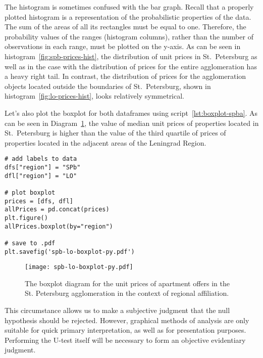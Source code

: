 \documentclass[]{scrreprt}
\begin{document}
The histogram is sometimes confused with the bar graph. Recall that a properly plotted histogram is a representation of the probabilistic properties of the data. The sum of the areas of all its rectangles must be equal to one. Therefore, the probability values of the ranges (histogram columns), rather than the number of observations in each range, must be plotted on the y-axis. As can be seen in histogram~\ref{fig:spb-prices-hist}, the distribution of unit prices in St.~Petersburg as well as in the case with the distribution of prices for the entire agglomeration has a heavy right tail. In contrast, the distribution of prices for the agglomeration objects located outside the boundaries of St.~Petersburg, shown in histogram~\ref{fig:lo-prices-hist}, looks relatively symmetrical.

Let's also plot the boxplot for both dataframes using script~\ref{lst:boxplot-spba}. As can be seen in Diagram~\ref{fig:spb-lo-boxplot-py}, the value of median unit prices of properties located in St.~Petersburg is higher than the value of the third quartile of prices of properties located in the adjacent areas of the Leningrad Region.
%
\begin{lstlisting}[float, caption = Plotting the boxplot for both subsamples, firstnumber=1, label= lst:boxplot-spba]
# add labels to data
dfs["region"] = "SPb"
dfl["region"] = "LO"

# plot boxplot
prices = [dfs, dfl]
allPrices = pd.concat(prices)
plt.figure()
allPrices.boxplot(by="region")

# save to .pdf
plt.savefig('spb-lo-boxplot-py.pdf')
\end{lstlisting} 
%
\begin{figure}[htp]
	\centering
	\texttt{[image: spb-lo-boxplot-py.pdf]}
	\caption{The boxplot diagram for the unit prices of apartment offers in the St. Petersburg agglomeration in the context of regional affiliation.}
	\label{fig:spb-lo-boxplot-py}
\end{figure}

This circumstance allows us to make a subjective judgment that the null hypothesis should be rejected. However, graphical methods of analysis are only suitable for quick primary interpretation, as well as for presentation purposes. Performing the U-test itself will be necessary to form an objective evidentiary judgment.
\end{document}

